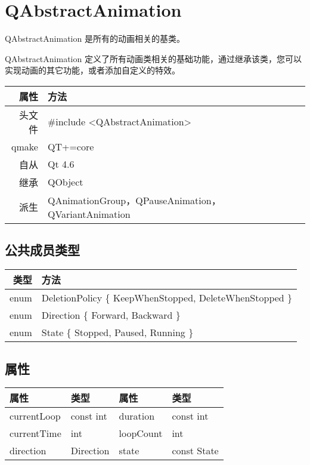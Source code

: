 \chapter{QAbstractAnimation}


QAbstractAnimation 是所有的动画相关的基类。

QAbstractAnimation 定义了所有动画类相关的基础功能，通过继承该类，您可以实现动画的其它功能，或者添加自定义的特效。

\begin{tabular}{|r|l|}
	\hline
	属性 & 方法 \\
	\hline
	头文件 & \#include <QAbstractAnimation>\\      
	\hline
	qmake & QT+=core\\      
	\hline
	自从 & Qt 4.6\\
	\hline
	继承&QObject \\
	\hline
	派生 & QAnimationGroup，QPauseAnimation，QVariantAnimation \\
	\hline
\end{tabular}

\section{公共成员类型}

\begin{tabular}{|r|l|}
	\hline
	类型 & 方法 \\
	\hline
	enum & DeletionPolicy \{ KeepWhenStopped, DeleteWhenStopped \}\\      
	\hline
	enum & Direction \{ Forward, Backward \}\\      
	\hline
	enum & State \{ Stopped, Paused, Running \}\\
	\hline
\end{tabular}

\section{属性}

\begin{tabular}{|l|l|l|l|}
	\hline
	属性 & 类型 &属性 &类型 \\
	\hline
		currentLoop & const int &duration &const int \\
	\hline
	currentTime	&int&	loopCount&	int\\
	\hline
	direction	&Direction	&state&	const State\\
	\hline
\end{tabular}


